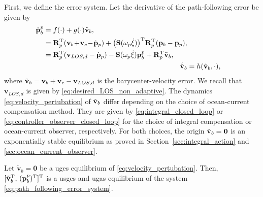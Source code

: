 First, we define the error system. Let the derivative of the path-following error be given by
\begin{subequations}\label{eq:path_following_error_system}
\begin{align}
    \begin{split}
        \dot{\mathbf{p}}_b^p &= f(\cdot) + g(\cdot) \Tilde{\mathbf{v}}_b,\\
            &= \mathbf{R}_p^{\rm T}(\mathbf{v}_b \!+\! \mathbf{v}_c\!-\!\dot{\mathbf{p}}_p) +  \bigl(\mathbf{S}(\omega_p \dot{\xi})\bigr)^{\rm T}\mathbf{R}_p^{\rm T}(\mathbf{p}_b - \mathbf{p}_p),\\
            &= \mathbf{R}_p^{\rm T}(\mathbf{v}_{LOS,d} -\dot{\mathbf{p}}_p) - \mathbf{S}(\omega_p \dot{\xi})\mathbf{p}_b^p +\mathbf{R}_p^{\rm T}\Tilde{\mathbf{v}}_b,\label{eq:path_error_dynamics}
    \end{split}\\
        \dot{\Tilde{\mathbf{v}}}_b &= h(\tilde{\mathbf{v}}_b,\cdot),\label{eq:velocity_pertubation}
\end{align}
\end{subequations}
where $\Tilde{\mathbf{v}}_b = \mathbf{v}_b + \mathbf{v}_c - \mathbf{v}_{LOS,d}$ is the barycenter-velocity error. We recall that $\mathbf{v}_{LOS,d}$ is given by \eqref{eq:desired_LOS_non_adaptive}. The dynamics \eqref{eq:velocity_pertubation} of $\Tilde{\mathbf{v}}_b$ differ depending on the choice of ocean-current compensation method. They are given by \eqref{eq:integral_closed_loop} or \eqref{eq:controller_observer_closed_loop} for the choice of integral compensation or ocean-current observer, respectively. For both choices, the origin $\Tilde{\mathbf{v}}_b = \mathbf{0}$ is an exponentially stable equilibrium as proved in Section~\ref{sec:integral_action} and \ref{sec:ocean_current_observer}.

\begin{theorem}\label{theorem:path_following}
    Let $\tilde{\mathbf{v}}_b = \mathbf{0}$ be a \gls{uges} equilibrium  of \eqref{eq:velocity_pertubation}. Then, $[\Tilde{\mathbf{v}}_b^{\rm T}, \,(\mathbf{p}_b^p)^{\rm T}]^{\rm T}$ is a \gls{usges} and \gls{ugas} equilibrium  of the system \eqref{eq:path_following_error_system}.
\end{theorem}

